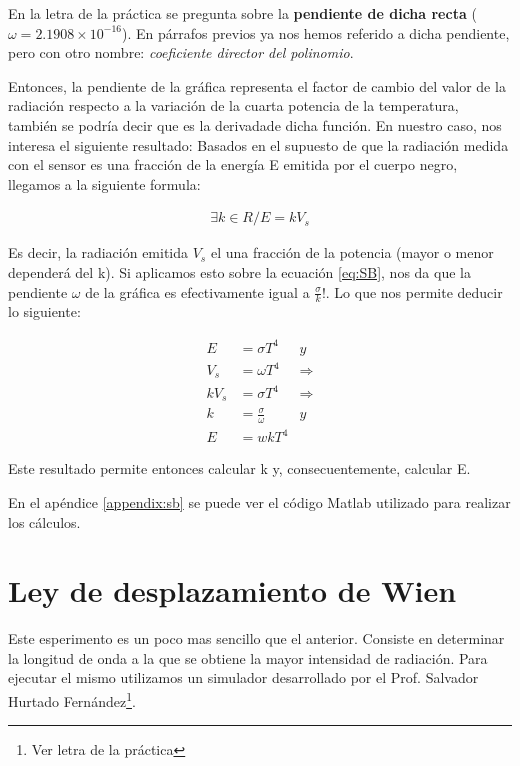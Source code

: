 \documentclass[a4paper]{article}
\begin{document}
En la letra de la práctica se pregunta sobre la \textbf{pendiente de dicha recta} ($\omega = 2.1908 \times 10^{-16}$). En párrafos previos ya nos hemos referido a dicha pendiente, pero con otro nombre: \textit{coeficiente director del polinomio}.

Entonces, la pendiente de la gráfica representa el factor de cambio del valor de la radiación respecto a la variación de la cuarta potencia de la temperatura, también se podría decir que es la derivada\newpage de dicha función. En nuestro caso, nos interesa el siguiente resultado:
Basados en el supuesto de que la radiación medida con el sensor es una fracción de la energía E emitida por el cuerpo negro, llegamos a la siguiente formula:

\begin{align}
\exists k \in R / E = k V_s
\end{align}

Es decir, la radiación emitida $V_s$ el una fracción de la potencia (mayor o menor dependerá del k). Si aplicamos esto sobre la ecuación \ref{eq:SB}, nos da que la pendiente $\omega$ de la gráfica es efectivamente igual a $\frac{\sigma}{k}$!. Lo que nos permite deducir lo siguiente:

\begin{align*}
E &= \sigma T^4 & y\\
V_s &= \omega T^4 & \Rightarrow\\
kV_s &= \sigma T^4 & \Rightarrow\\
k &= \frac{\sigma}{\omega} & y\\
E &= wkT^4
\end{align*}

Este resultado permite entonces calcular k y, consecuentemente, calcular E.

En el apéndice \ref{appendix:sb} se puede ver el código Matlab utilizado para realizar los cálculos.

\newpage
\section{Ley de desplazamiento de Wien}

Este esperimento es un poco mas sencillo que el anterior. Consiste en determinar la longitud de onda a la que se obtiene la mayor intensidad de radiación. Para ejecutar el mismo utilizamos un simulador desarrollado por el Prof. Salvador Hurtado Fernández\footnote{Ver letra de la práctica}.
\end{document}
